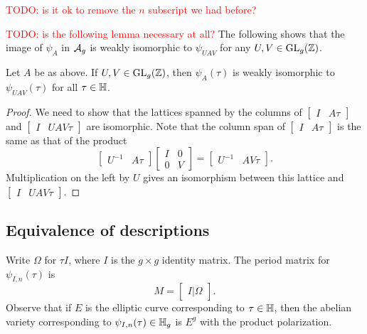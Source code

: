 \documentclass{amsart}
\begin{document}
\textcolor{red}{TODO: is it ok to remove the $n$ subscript we had before?}

\textcolor{red}{TODO: is the following lemma necessary at all?}
The following shows that the image of $\psi_A$ in $\mathcal{A}_g$ is weakly isomorphic to $\psi_{UAV}$ for any $U,V \in \operatorname{GL}_g(\mathbb{Z})$.

\begin{lemma}\label{lem:A-UAV-weakly-isom}
  Let $A$ be as above. If $U,V \in \operatorname{GL}_g(\mathbb{Z})$, then $\psi_{A}(\tau)$ is weakly isomorphic to $\psi_{UAV}(\tau)$ for all $\tau \in \mathbb{H}$.
\end{lemma}
\begin{proof}
  We need to show that the lattices spanned by the columns of $\begin{bmatrix} I & A\tau \end{bmatrix}$ and $\begin{bmatrix} I & UAV\tau \end{bmatrix}$ are isomorphic. Note that the column span of $\begin{bmatrix} I & A\tau \end{bmatrix}$ is the same as that of the product
  \[
    \begin{bmatrix} U^{-1} & A\tau \end{bmatrix}\begin{bmatrix} I & 0 \\ 0 & V \end{bmatrix}
    =
    \begin{bmatrix} U^{-1} & AV\tau \end{bmatrix}.
  \]
  Multiplication on the left by $U$ gives an isomorphism between this lattice and $\begin{bmatrix} I & UAV\tau \end{bmatrix}$.
\end{proof}



\subsection{Equivalence of descriptions}

Write $\Omega$ for $\tau I$, where $I$ is the $g \times g$ identity matrix. The period matrix for $\psi_{I,n}(\tau)$ is
\[
  M = \begin{bmatrix}
    I | \Omega
  \end{bmatrix}.
\]
Observe that if $E$ is the elliptic curve corresponding to $\tau \in \mathbb{H}$, then the abelian variety corresponding to $\psi_{I,n}(\tau) \in \mathbb{H}_g$ is $E^g$ with the product polarization.
\end{document}
